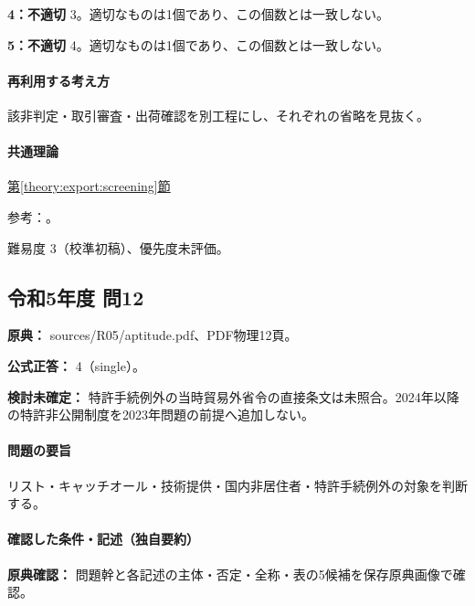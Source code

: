 \noindent\textbf{4：不適切} 3。適切なものは1個であり、この個数とは一致しない。\par

\noindent\textbf{5：不適切} 4。適切なものは1個であり、この個数とは一致しない。\par

\paragraph{再利用する考え方} 該非判定・取引審査・出荷確認を別工程にし、それぞれの省略を見抜く。

\paragraph{共通理論} \hyperref[theory:export:screening]{第\ref*{theory:export:screening}節}

\par 参考：\cite{export_overview,export_current_updates}。

\par 難易度 3（校準初稿）、優先度未評価。

\subsection{令和5年度 問12}
\label{q:r05-reg-apt-12}

\noindent\textbf{原典：} sources/R05/aptitude.pdf、PDF物理12頁。

\textbf{公式正答：} 4（single）。

\par\textbf{検討未確定：} 特許手続例外の当時貿易外省令の直接条文は未照合。2024年以降の特許非公開制度を2023年問題の前提へ追加しない。

\paragraph{問題の要旨} リスト・キャッチオール・技術提供・国内非居住者・特許手続例外の対象を判断する。

\paragraph{確認した条件・記述（独自要約）}\mbox{}\par

\noindent\textbf{原典確認：} 問題幹と各記述の主体・否定・全称・表の5候補を保存原典画像で確認。\par

